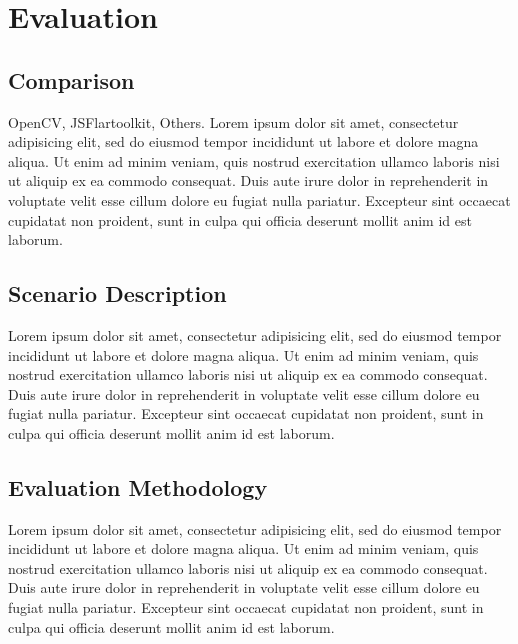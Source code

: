 \chapter{Evaluation} %
\label{cha:evaluation}

\section{Comparison} %
\label{sec:evaluation:comparison}

OpenCV, JSFlartoolkit, Others.
Lorem ipsum dolor sit amet, consectetur adipisicing elit, sed do eiusmod
tempor incididunt ut labore et dolore magna aliqua. Ut enim ad minim veniam,
quis nostrud exercitation ullamco laboris nisi ut aliquip ex ea commodo
consequat. Duis aute irure dolor in reprehenderit in voluptate velit esse
cillum dolore eu fugiat nulla pariatur. Excepteur sint occaecat cupidatat non
proident, sunt in culpa qui officia deserunt mollit anim id est laborum.


\section{Scenario Description} %
\label{sec:evaluation:scenario_description}

Lorem ipsum dolor sit amet, consectetur adipisicing elit, sed do eiusmod
tempor incididunt ut labore et dolore magna aliqua. Ut enim ad minim veniam,
quis nostrud exercitation ullamco laboris nisi ut aliquip ex ea commodo
consequat. Duis aute irure dolor in reprehenderit in voluptate velit esse
cillum dolore eu fugiat nulla pariatur. Excepteur sint occaecat cupidatat non
proident, sunt in culpa qui officia deserunt mollit anim id est laborum.


\section{Evaluation Methodology} %
\label{sec:evaluation:evaluation_methodology}

Lorem ipsum dolor sit amet, consectetur adipisicing elit, sed do eiusmod
tempor incididunt ut labore et dolore magna aliqua. Ut enim ad minim veniam,
quis nostrud exercitation ullamco laboris nisi ut aliquip ex ea commodo
consequat. Duis aute irure dolor in reprehenderit in voluptate velit esse
cillum dolore eu fugiat nulla pariatur. Excepteur sint occaecat cupidatat non
proident, sunt in culpa qui officia deserunt mollit anim id est laborum.

